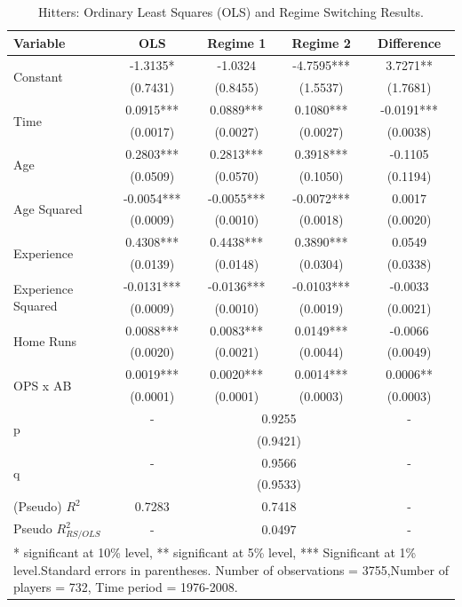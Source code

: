 \documentclass[12pt]{article}
\begin{document}
\begin{table} \caption{Hitters: Ordinary Least Squares (OLS) and Regime Switching Results.}
\begin{center}
\begin{tabular}{l|c|cc|c} 
Variable & OLS & Regime 1 & Regime 2 & Difference \\ \hline 

 \multirow{2}{*}{Constant} & -1.3135* & -1.0324  & -4.7595*** & 3.7271** \\ 
 & (0.7431) & (0.8455) & (1.5537) & (1.7681) \\ [0.4pc]
 \multirow{2}{*}{Time} & 0.0915*** & 0.0889*** & 0.1080*** & -0.0191*** \\ 
 & (0.0017) & (0.0027) & (0.0027) & (0.0038) \\ [0.4pc]
 \multirow{2}{*}{Age} & 0.2803*** & 0.2813*** & 0.3918*** & -0.1105  \\ 
 & (0.0509) & (0.0570) & (0.1050) & (0.1194) \\ [0.4pc]
 \multirow{2}{*}{Age Squared} & -0.0054*** & -0.0055*** & -0.0072*** & 0.0017  \\ 
 & (0.0009) & (0.0010) & (0.0018) & (0.0020) \\ [0.4pc]
 \multirow{2}{*}{Experience} & 0.4308*** & 0.4438*** & 0.3890*** & 0.0549  \\ 
 & (0.0139) & (0.0148) & (0.0304) & (0.0338) \\ [0.4pc]
 \multirow{2}{*}{Experience Squared} & -0.0131*** & -0.0136*** & -0.0103*** & -0.0033  \\ 
 & (0.0009) & (0.0010) & (0.0019) & (0.0021) \\ [0.4pc]
 \multirow{2}{*}{Home Runs} & 0.0088*** & 0.0083*** & 0.0149*** & -0.0066  \\ 
 & (0.0020) & (0.0021) & (0.0044) & (0.0049) \\ [0.4pc]
 \multirow{2}{*}{OPS x AB} & 0.0019*** & 0.0020*** & 0.0014*** & 0.0006** \\ 
 & (0.0001) & (0.0001) & (0.0003) & (0.0003) \\ [0.4pc]\hline 
\multirow{2}{*}{p} & - & \multicolumn{2}{c|}{0.9255} & - \\ 
 & & \multicolumn{2}{c|}{(0.9421)} & \\ [0.4pc] 
\multirow{2}{*}{q} & - & \multicolumn{2}{c|}{0.9566} & - \\ 
 & & \multicolumn{2}{c|}{(0.9533)} & \\ \hline 
(Pseudo) $R^2$ & 0.7283 & \multicolumn{2}{c|}{0.7418} & - \\ 
Pseudo $R_{RS/OLS}^2$ & - & \multicolumn{2}{c|}{0.0497} & - \\ \hline
\multicolumn{5}{p{5in}}{\footnotesize{* significant at 10\% level, ** significant at 5\% level, *** Significant at 1\% level.\newline Standard errors in parentheses.  Number of observations = 3755,\newline Number of players = 732, Time period = 1976-2008.}}
\end{tabular}
\end{center}
\end{table}
\end{document}
